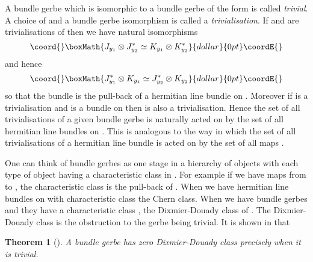 \documentclass[a4paper,reqno]{amsart}
\theoremstyle{plain}
\newtheorem{theorem}{Theorem}[section]
\theoremstyle{definition}
\theoremstyle{remark}
\numberwithin{equation}{section}
\numberwithin{figure}{section}
\providecommand{\ZZ}{{\mathbb Z}}
\providecommand{\<}{\langle}
\renewcommand{\>}{\rangle}
\begin{document}
A bundle gerbe which is isomorphic
to a  bundle gerbe of the form \coordHE{} is  called {\em trivial}.
A choice of \coordHE{} and  a bundle gerbe  isomorphism \coordHE{} is called
a {\em trivialisation}.  If \coordHE{} and \coordHE{} are trivialisations
of \coordHE{} then we have natural isomorphisms
$$\coord{}\boxMath{
J_{y_1}\otimes J_{y_2}^* \simeq K_{y_1}\otimes K_{y_2}^*
}{dollar}{0pt}\coordE{}$$
and hence
$$\coord{}\boxMath{
J_{y_1}^*\otimes K_{y_1} \simeq J_{y_2}^*\otimes K_{y_2}
}{dollar}{0pt}\coordE{}$$
so that the bundle \coordHE{} is the pull-back of a hermitian line
bundle on \coordHE{}. Moreover if \coordHE{} is a trivialisation and
\coordHE{} is a bundle on \coordHE{} then \coordHE{} is
also a trivialisation.  Hence the set of all trivialisations of
a given bundle gerbe is naturally acted on by the set of all
hermitian line bundles on \coordHE{}.  This is analogous to the way in which the
set of all trivialisations of a hermitian line bundle \coordHE{} is acted
on by the set of all maps \coordHE{}.

One can think of
bundle gerbes as one stage in a hierarchy of objects with
each type of object having a characteristic class in \myHighlight{$H^p(M, \ZZ)$}\coordHE{}.
For example if \coordHE{} we have maps from \coordHE{} to \coordHE{}, the characteristic
class is the pull-back of \coordHE{}.  When \coordHE{}  we have hermitian line
bundles on \coordHE{} with
characteristic class the Chern class. When \coordHE{} we have bundle gerbes and
they have a characteristic class \myHighlight{$d(L) = d(L, Y) \in H^3(M, \ZZ)$}\coordHE{},
the Dixmier-Douady class of \coordHE{}.  The Dixmier-Douady class is the
obstruction to the gerbe being trivial.
It is shown in \cite{Mur} that
\begin{theorem}[\cite{Mur}]
\label{th:trivial}
A bundle gerbe \coordHE{} has zero Dixmier-Douady class
precisely when it is trivial.
\end{theorem}
\end{document}
